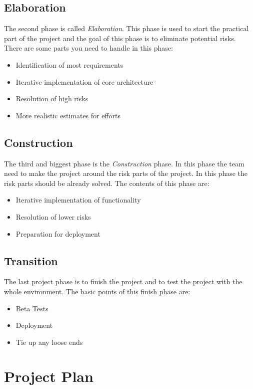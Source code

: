 \subsection{Elaboration}
The second phase is called \textit{Elaboration}. This phase is used to start the practical part of the project and the goal of this phase is to eliminate potential risks. There are some parts you need to handle in this phase:
\begin{itemize}
    \item Identification of most requirements
    \item Iterative implementation of core architecture
    \item Resolution of high risks
    \item More realistic estimates for efforts
\end{itemize}

\subsection{Construction}
The third and biggest phase is the \textit{Construction} phase. In this phase the team need to make the project around the risk parts of the project. In this phase the risk parts should be already solved.
The contents of this phase are:
\begin{itemize}
    \item Iterative implementation of functionality
    \item Resolution of lower risks
    \item Preparation for deployment
\end{itemize}

\subsection{Transition}
The last project phase is to finish the project and to test the project with the whole environment.
The basic points of this finish phase are:
\begin{itemize}
    \item Beta Tests
    \item Deployment
    \item Tie up any loose ends
\end{itemize}

\section{Project Plan}
